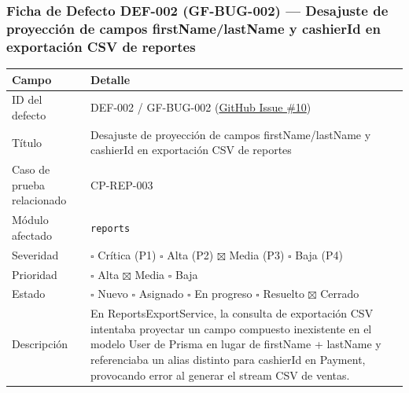 \documentclass[10pt,a4paper]{article}
\newcounter{none}
\begin{document}
\subsubsection{Ficha de Defecto DEF-002 (GF-BUG-002) --- Desajuste de proyección de campos firstName/lastName y cashierId en exportación CSV de reportes}\label{ficha-de-defecto-def-002-gf-bug-002--desajuste-de-proyecciuxf3n-de-campos-firstnamelastname-y-cashierid-en-exportaciuxf3n-csv-de-reportes}

\begingroup\singlespacing\footnotesize\setlength{\parskip}{0pt}

{\def\LTcaptype{none} %
\begin{longtable}[]{@{}
  >{\raggedright\arraybackslash}p{}
  >{\raggedright\arraybackslash}p{}@{}}
\toprule\noalign{}
\begin{minipage}[b]{\linewidth}\raggedright
Campo
\end{minipage} & \begin{minipage}[b]{\linewidth}\raggedright
Detalle
\end{minipage} \\
\midrule\noalign{}
\endhead
\bottomrule\noalign{}
\endlastfoot
ID del defecto & DEF-002 / GF-BUG-002 (\href{https://github.com/H3llz07/GastroForge-Testing/issues/10}{GitHub Issue \#10}) \\
Título & Desajuste de proyección de campos firstName/lastName y cashierId en exportación CSV de reportes \\
Caso de prueba relacionado & CP-REP-003 \\
Módulo afectado & \texttt{reports} \\
Severidad & \ensuremath{\square} Crítica (P1) \ensuremath{\square} Alta (P2) \ensuremath{\boxtimes} Media (P3) \ensuremath{\square} Baja (P4) \\
Prioridad & \ensuremath{\square} Alta \ensuremath{\boxtimes} Media \ensuremath{\square} Baja \\
Estado & \ensuremath{\square} Nuevo \ensuremath{\square} Asignado \ensuremath{\square} En progreso \ensuremath{\square} Resuelto \ensuremath{\boxtimes} Cerrado \\
Descripción & En ReportsExportService, la consulta de exportación CSV intentaba proyectar un campo compuesto inexistente en el modelo User de Prisma en lugar de firstName + lastName y referenciaba un alias distinto para cashierId en Payment, provocando error al generar el stream CSV de ventas. \\

\end{longtable}}
\end{document}

